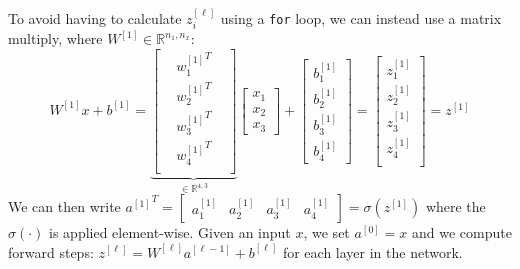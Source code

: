 \documentclass[12pt]{article}
\begin{document}
To avoid having to calculate $z_i^{[\ell]}$ using a \texttt{for}
loop, we can instead use a matrix multiply, where $W^{[1]} \in \mathbb R^{n_1, n_x}$:
$$
W^{[1]}x + b^{[1]} = 
\underbrace{\begin{bmatrix}    & {w_1^{[1]}}^T & \\
   & {w_2^{[1]}}^T & \\    & {w_3^{[1]}}^T & \\    
   & {w_4^{[1]}}^T & \\ 
\end{bmatrix}}_{\in \mathbb R^{4, 3}} \begin{bmatrix} x_1 \\ x_2 \\ x_3  \end{bmatrix} + \begin{bmatrix}   b_1^{[1]} \\ b_2^{[1]} \\ b_3^{[1]} \\ b_4^{[1]} \end{bmatrix} = \begin{bmatrix}   z_1^{[1]} \\
  z_2^{[1]} \\
  z_3^{[1]} \\
  z_4^{[1]} \\ \end{bmatrix} = z^{[1]}
$$
We can then write ${a^{[1]}}^T = \begin{bmatrix}   a_1^{[1]} & a_2^{[1]} & a_3^{[1]} & a_4^{[1]} \end{bmatrix} = \sigma (z^{[1]})$ where the $\sigma(\cdot)$ is applied element-wise.
Given an input $x$, we set $a^{[0]} = x$ and we compute forward steps: $z^{[\ell]} = W^{[\ell]}a^{[\ell-1]} + b^{[\ell]}$
for each layer in the network.
\end{document}
